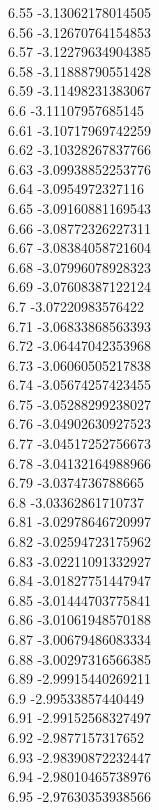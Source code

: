 {6.55	-3.13062178014505\\
6.56	-3.12670764154853\\
6.57	-3.12279634904385\\
6.58	-3.11888790551428\\
6.59	-3.11498231383067\\
6.6	-3.11107957685145\\
6.61	-3.10717969742259\\
6.62	-3.10328267837766\\
6.63	-3.09938852253776\\
6.64	-3.0954972327116\\
6.65	-3.09160881169543\\
6.66	-3.08772326227311\\
6.67	-3.08384058721604\\
6.68	-3.07996078928323\\
6.69	-3.07608387122124\\
6.7	-3.07220983576422\\
6.71	-3.06833868563393\\
6.72	-3.06447042353968\\
6.73	-3.06060505217838\\
6.74	-3.05674257423455\\
6.75	-3.05288299238027\\
6.76	-3.04902630927523\\
6.77	-3.04517252756673\\
6.78	-3.04132164988966\\
6.79	-3.0374736788665\\
6.8	-3.03362861710737\\
6.81	-3.02978646720997\\
6.82	-3.02594723175962\\
6.83	-3.02211091332927\\
6.84	-3.01827751447947\\
6.85	-3.01444703775841\\
6.86	-3.01061948570188\\
6.87	-3.00679486083334\\
6.88	-3.00297316566385\\
6.89	-2.99915440269211\\
6.9	-2.99533857440449\\
6.91	-2.99152568327497\\
6.92	-2.9877157317652\\
6.93	-2.98390872232447\\
6.94	-2.98010465738976\\
6.95	-2.97630353938566\\
}
